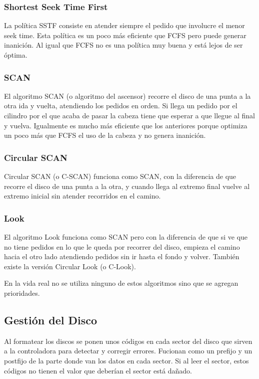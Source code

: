 \documentclass{article}
\begin{document}
\subsubsection{Shortest Seek Time First}

La pol\'itica SSTF consiste en atender siempre el pedido que involucre el menor seek time. Esta pol\'itica es un poco m\'as eficiente que FCFS pero puede generar inanici\'on. Al igual que FCFS no es una pol\'itica muy buena y est\'a lejos de ser \'optima.

\subsubsection{SCAN}

El algoritmo SCAN (o algoritmo del ascensor) recorre el disco de una punta a la otra ida y vuelta, atendiendo los pedidos en orden. Si llega un pedido por el cilindro por el que acaba de pasar la cabeza tiene que esperar a que llegue al final y vuelva. Igualmente es mucho m\'as eficiente que los anteriores porque optimiza un poco m\'as que FCFS el uso de la cabeza y no genera inanici\'on.

\subsubsection{Circular SCAN}

Circular SCAN (o C-SCAN) funciona como SCAN, con la diferencia de que recorre el disco de una punta a la otra, y cuando llega al extremo final vuelve al extremo inicial sin atender recorridos en el camino.

\subsubsection{Look}

El algoritmo Look funciona como SCAN pero con la diferencia de que si ve que no tiene pedidos en lo que le queda por recorrer del disco, empieza el camino hacia el otro lado atendiendo pedidos sin ir hasta el fondo y volver. Tambi\'en existe la versi\'on Circular Look (o C-Look).

En la vida real no se utiliza ninguno de estos algoritmos sino que se agregan prioridades.

\subsection{Gesti\'on del Disco}

Al formatear los discos se ponen unos c\'odigos en cada sector del disco que sirven a la controladora para detectar y corregir errores. Fucionan como un prefijo y un postfijo de la parte donde van los datos en cada sector. Si al leer el sector, estos c\'odigos no tienen el valor que deber\'ian el sector est\'a da\~nado.
\end{document}
